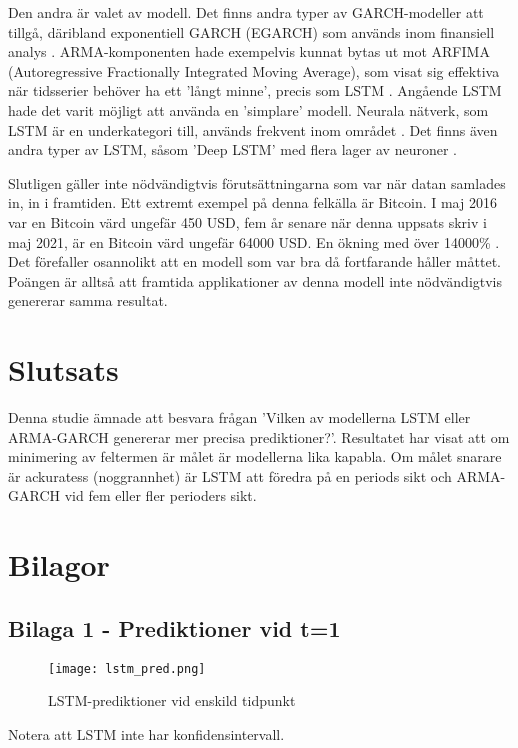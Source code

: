 \documentclass[12pt]{article}
\begin{document}
Den andra är valet av modell. Det finns andra typer av GARCH-modeller att tillgå, däribland exponentiell GARCH (EGARCH) som används inom finansiell analys \parencite{nelson1991conditional}. ARMA-komponenten hade exempelvis kunnat bytas ut mot ARFIMA (Autoregressive Fractionally Integrated Moving Average), som visat sig effektiva när tidsserier behöver ha ett 'långt minne', precis som LSTM \parencite{taqqu1995estimators}. Angående LSTM hade det varit möjligt att använda en 'simplare' modell. Neurala nätverk, som LSTM är en underkategori till, används frekvent inom området \parencite[se t.ex.][]{rather2015recurrent, li2010applications}. Det finns även andra typer av LSTM, såsom 'Deep LSTM' med flera lager av neuroner \parencite[se t.ex. applikation i][]{hansson2017stock}.

Slutligen gäller inte nödvändigtvis förutsättningarna som var när datan samlades in, in i framtiden. Ett extremt exempel på denna felkälla är Bitcoin. I maj 2016 var en Bitcoin värd ungefär 450 USD, fem år senare när denna uppsats skriv i maj 2021, är en Bitcoin värd ungefär 64000 USD. En ökning med över 14000\% \parencite{yahoo_bitcoin}. Det förefaller osannolikt att en modell som var bra då fortfarande håller måttet. Poängen är alltså att framtida applikationer av denna modell inte nödvändigtvis genererar samma resultat.


\section{Slutsats}
Denna studie ämnade att besvara frågan 'Vilken av modellerna LSTM eller ARMA-GARCH genererar mer precisa prediktioner?'. Resultatet har visat att om minimering av feltermen är målet är modellerna lika kapabla. Om målet snarare är ackuratess (noggrannhet) är LSTM att föredra på en periods sikt och ARMA-GARCH vid fem eller fler perioders sikt. 




\newpage
\section{Bilagor}

\newpage
\subsection{Bilaga 1 - Prediktioner vid t=1}
\begin{figure}[H]
\caption{LSTM-prediktioner vid enskild tidpunkt}
\texttt{[image: lstm\_pred.png]}
\centering
\end{figure}
Notera att LSTM inte har konfidensintervall.
\end{document}
